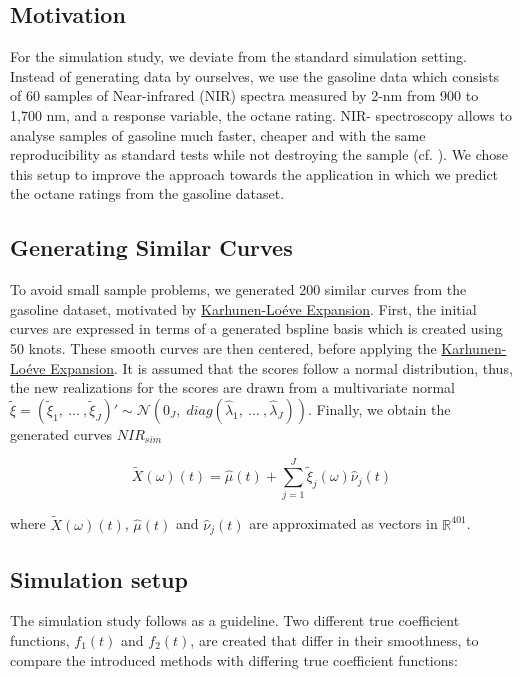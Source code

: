 \documentclass[11pt,twoside,a4paper]{article}
\begin{document}
	\subsection{Motivation}
	For the simulation study, we deviate from the standard simulation setting. Instead of generating data by ourselves, we use the gasoline data which consists of 60 samples of Near-infrared (NIR) spectra measured by 2-nm from 900 to 1,700 nm, and a response variable,  the octane rating. NIR- spectroscopy allows to analyse samples of gasoline much faster, cheaper and with the same reproducibility as standard tests while not destroying the sample (cf. \cite{Bohacs_Ovadi_Salgo1998}). We chose this setup to improve the approach towards the application in which we  predict the octane ratings from the gasoline dataset.
	
	\subsection{Generating Similar Curves}
	To avoid small sample problems, we generated 200 similar curves from the gasoline dataset, motivated by \hyperlink{KL}{Karhunen-Lo\'{e}ve Expansion}. First, the initial curves are expressed in terms of a generated bspline basis which is created using 50 knots. These smooth curves are then centered, before applying the \hyperlink{KL}{Karhunen-Lo\'{e}ve Expansion}. It is assumed that the scores follow a normal distribution, thus, the new realizations for the scores are drawn from a multivariate normal $\tilde{\xi} = \left(\tilde{\xi}_{1},\: \dots \:, \tilde{\xi}_{J}\right)' \sim \mathcal{N}(0_J, \; diag(\hat{\lambda}_1,\: \dots\:, \hat{\lambda}_J))$. Finally, we obtain the generated curves $NIR_{sim}$
	
	
		$$\tilde{X}(\omega)(t) = \hat{\mu}(t) + \sum_{j = 1}^{J} \tilde{\xi}_j(\omega) \hat{\nu}_j(t)$$ 

		where
			$\tilde{X}(\omega)(t)$, $\hat{\mu}(t)$ and $\hat{\nu}_j(t)$ are approximated as vectors in $\mathbb{R}^{401}$.
		
	
    
    \subsection{Simulation setup}
	The simulation study follows \cite{Reiss_2007b} as a guideline. Two different true coefficient functions,  $f_1(t)$ and  $f_2(t)$, are created that differ in their smoothness, to compare the introduced methods with differing true coefficient functions:
	
\end{document}
